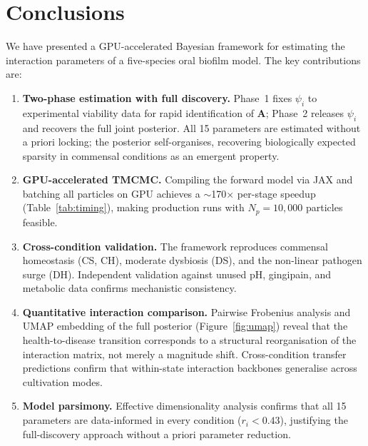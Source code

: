 \documentclass[11pt,a4paper]{article}
\begin{document}
\section{Conclusions}
\label{sec:conclusions}

We have presented a GPU-accelerated Bayesian framework for estimating the interaction parameters of a five-species oral biofilm model.
The key contributions are:

\begin{enumerate}[nosep,leftmargin=*]
\item \textbf{Two-phase estimation with full discovery.}
Phase~1 fixes $\psi_i$ to experimental viability data for rapid identification of $\mathbf{A}$; Phase~2 releases $\psi_i$ and recovers the full joint posterior.
All 15 parameters are estimated without a priori locking; the posterior self-organises, recovering biologically expected sparsity in commensal conditions as an emergent property.

\item \textbf{GPU-accelerated TMCMC.}
Compiling the forward model via JAX and batching all particles on GPU achieves a $\sim$170$\times$ per-stage speedup (Table~\ref{tab:timing}), making production runs with $N_p=10{,}000$ particles feasible.

\item \textbf{Cross-condition validation.}
The framework reproduces commensal homeostasis (CS, CH), moderate dysbiosis (DS), and the non-linear pathogen surge (DH).
Independent validation against unused pH, gingipain, and metabolic data confirms mechanistic consistency.

\item \textbf{Quantitative interaction comparison.}
Pairwise Frobenius analysis and UMAP embedding of the full posterior (Figure~\ref{fig:umap}) reveal that the health-to-disease transition corresponds to a structural reorganisation of the interaction matrix, not merely a magnitude shift.
Cross-condition transfer predictions confirm that within-state interaction backbones generalise across cultivation modes.

\item \textbf{Model parsimony.}
Effective dimensionality analysis confirms that all 15 parameters are data-informed in every condition ($r_i<0.43$), justifying the full-discovery approach without a priori parameter reduction.
\end{enumerate}
\end{document}

